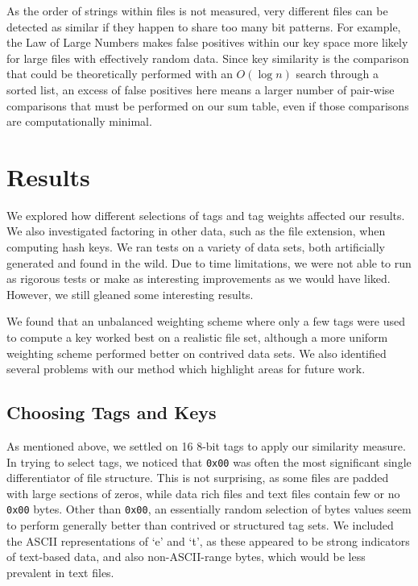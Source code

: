 \documentclass[10pt, twocolumn]{article}
\begin{document}
As the order of strings within files is not measured, very different files can be detected as similar if they happen to share too many bit patterns.  For example, the Law of Large Numbers makes false positives within our key space more likely for large files with effectively random data.  Since key similarity is the comparison that could be theoretically performed with an $O(\log n)$ search through a sorted list, an excess of false positives here means a larger number of pair-wise comparisons that must be performed on our sum table, even if those comparisons are computationally minimal.

\section{Results}

We explored how different selections of tags and tag weights affected our results. We also investigated factoring in other data, such as the file extension, when computing hash keys.  We ran tests on a variety of data sets, both artificially generated and found in the wild. Due to time limitations, we were not able to run as rigorous tests or make as interesting improvements as we would have liked. However, we still gleaned some interesting results.

We found that an unbalanced weighting scheme where only a few tags were used to compute a key worked best on a realistic file set, although a more uniform weighting scheme performed better on contrived data sets. We also identified several problems with our method which highlight areas for future work.

\subsection{Choosing Tags and Keys}

As mentioned above, we settled on 16 8-bit tags to apply our similarity measure.  In trying to select tags, we noticed that {\tt 0x00} was often the most significant single differentiator of file structure.  This is not surprising, as some files are padded with large sections of zeros, while data rich files and text files contain few or no {\tt 0x00} bytes.  Other than {\tt 0x00}, an essentially random selection of bytes values seem to perform generally better than contrived or structured tag sets.  We included the ASCII representations of `e' and `t', as these appeared to be strong indicators of text-based data, and also non-ASCII-range bytes, which would be less prevalent in text files.
\end{document}
